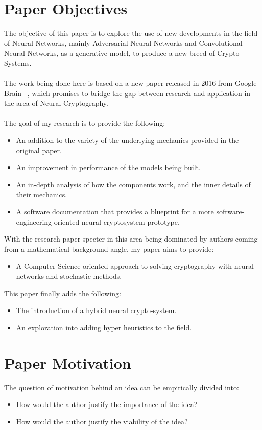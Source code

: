 \documentclass[a4paper, 12pt]{report}
\begin{document}
\section{\textbf{Paper Objectives}}
The objective of this paper is to explore the use of new developments in the field of Neural Networks, mainly Adversarial Neural Networks and Convolutional Neural Networks, as a generative model, to produce a new breed of Crypto-Systems.\\\\
The work being done here is based on a new paper released in 2016 from Google Brain ~\citep{DBLP:journals/corr/AbadiA16}, which promises to bridge the gap between research and application in the area of Neural Cryptography.\\\\
The goal of my research is to provide the following:
\begin{itemize}
	\item An addition to the variety of the underlying mechanics provided in the original paper.
	\item An improvement in performance of the models being built.
	\item An in-depth analysis of how the components work, and the inner details of their mechanics.
	\item A software documentation that provides a blueprint for a more software-engineering oriented neural cryptosystem prototype.
\end{itemize}
With the research paper specter in this area being dominated by authors coming from a mathematical-background angle, my paper aims to provide:
\begin{itemize}
	\item A Computer Science oriented approach to solving cryptography with neural networks and stochastic methods.
\end{itemize}
This paper finally adds the following:
\begin{itemize}
	\item The introduction of a hybrid neural crypto-system.
	\item An exploration into adding hyper heuristics to the field.
\end{itemize}
\newpage
\section{\textbf{Paper Motivation}}
The question of motivation behind an idea can be empirically divided into:
\begin{itemize}[nosep]
	\item How would the author justify the importance of the idea?
	\item How would the author justify the viability of the idea?
\end{itemize}
\end{document}
